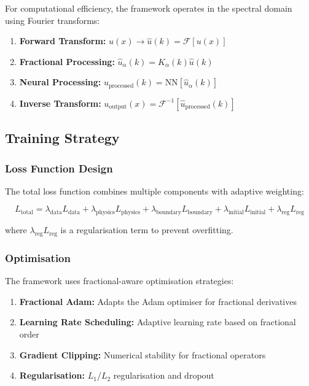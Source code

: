 \documentclass[12pt,a4paper]{article}
\theoremstyle{definition}
\begin{document}
For computational efficiency, the framework operates in the spectral domain using Fourier transforms:

\begin{enumerate}
    \item \textbf{Forward Transform:} $u(x) \to \hat{u}(k) = \mathcal{F}[u(x)]$
    \item \textbf{Fractional Processing:} $\hat{u}_\alpha(k) = K_\alpha(k) \hat{u}(k)$
    \item \textbf{Neural Processing:} $\hat{u}_{\text{processed}}(k) = \text{NN}[\hat{u}_\alpha(k)]$
    \item \textbf{Inverse Transform:} $u_{\text{output}}(x) = \mathcal{F}^{-1}[\hat{u}_{\text{processed}}(k)]$
\end{enumerate}

\subsection{Training Strategy}

\subsubsection{Loss Function Design}

The total loss function combines multiple components with adaptive weighting:

$$L_{\text{total}} = \lambda_{\text{data}} L_{\text{data}} + \lambda_{\text{physics}} L_{\text{physics}} + \lambda_{\text{boundary}} L_{\text{boundary}} + \lambda_{\text{initial}} L_{\text{initial}} + \lambda_{\text{reg}} L_{\text{reg}}$$

where $\lambda_{\text{reg}} L_{\text{reg}}$ is a regularisation term to prevent overfitting.

\subsubsection{Optimisation}

The framework uses fractional-aware optimisation strategies:

\begin{enumerate}
    \item \textbf{Fractional Adam:} Adapts the Adam optimiser for fractional derivatives
    \item \textbf{Learning Rate Scheduling:} Adaptive learning rate based on fractional order
    \item \textbf{Gradient Clipping:} Numerical stability for fractional operators
    \item \textbf{Regularisation:} $L_1$/$L_2$ regularisation and dropout
\end{enumerate}
\end{document}
